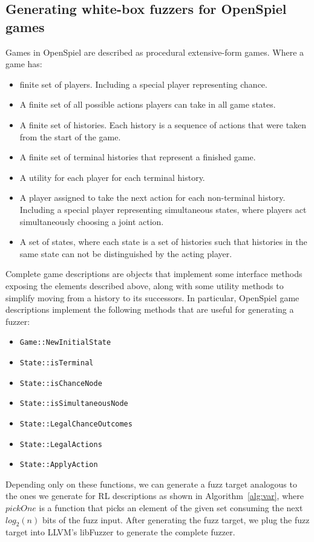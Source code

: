 \subsection{Generating white-box fuzzers for OpenSpiel games} \label{osWhiteBox}
Games in OpenSpiel are described as procedural extensive-form games. Where a game has:
\begin{itemize}
    \item finite set of players. Including a special player representing chance.
    \item A finite set of all possible actions players can take in all game states.
    \item A finite set of histories. Each history is a sequence of actions that were taken from the start
    of the game.
    \item A finite set of terminal histories that represent a finished game.
    \item A utility for each player for each terminal history.
    \item A player assigned to take the next action for each non-terminal history. Including a special player representing simultaneous states, 
        where players act simultaneously choosing a joint action.
    \item A set of states, where each state is a set of histories such that histories in the same state can not be distinguished by the acting player.
\end{itemize}

Complete game descriptions are objects that implement some interface methods exposing the elements 
described above, along with some utility methods to simplify moving from a history to its successors.
In particular, OpenSpiel game descriptions implement the following methods that are useful for generating a fuzzer:
\begin{itemize}
    \item \texttt{Game::NewInitialState}
    \item \texttt{State::isTerminal}
    \item \texttt{State::isChanceNode}
    \item \texttt{State::isSimultaneousNode}
    \item \texttt{State::LegalChanceOutcomes}
    \item \texttt{State::LegalActions}
    \item \texttt{State::ApplyAction}
\end{itemize}
Depending only on these functions, we can generate a fuzz target analogous to the ones we generate for RL descriptions 
as shown in Algorithm~\ref{alg:var}, where $pickOne$ is a function that picks an element of the given set consuming the next $log_2(n)$ bits of 
the fuzz input. After generating the fuzz target, we plug the fuzz target into LLVM's libFuzzer
to generate the complete fuzzer.

